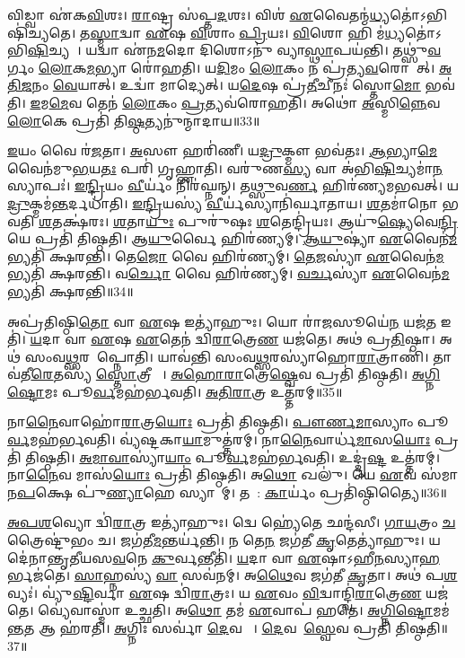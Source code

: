 𑌵𑌿𑌡𑍍𑌵𑌾 𑌏॑𑌕\ul{𑌵𑌿}\ul{}𑌶𑌃।
\ul{𑌰𑌾}𑌷𑍍𑌟𑍍𑌰 𑌸॑𑌪𑍍𑌤\ul{𑌦}𑌶𑌃।
𑌵𑌿𑌶॑ \ul{𑌏}𑌵𑍈𑌤𑌨𑍍𑌮॑\ul{𑌧𑍍𑌯}𑌤𑍋॑\-𑌽𑌭𑌿𑌷𑌿॑𑌚𑍍𑌯𑌤𑍇।
𑌤\ul{𑌸𑍍𑌮𑌾}𑌦𑍍𑌵𑌾 \ul{𑌏}𑌷 \ul{𑌵𑌿}𑌶𑌾𑌂 \ul{𑌪𑍍𑌰𑌿}𑌯𑌃।
\ul{𑌵𑌿}𑌶𑍋 𑌹𑌿 𑌮॑\ul{𑌧𑍍𑌯}𑌤𑍋॑\-𑌽𑌭𑌿\ul{𑌷𑌿}𑌚𑍍𑌯𑌤𑍇᳚।
𑌯𑌦𑍍𑌵𑌾 𑌏॑𑌨\ul{𑌮}𑌦𑍋 𑌦𑌿𑌶𑍋𑌽𑌨𑍁॑ 𑌵𑍍𑌯𑌾\ul{𑌸𑍍𑌥𑌾}𑌪𑌯॑𑌨𑍍𑌤𑌿।
𑌤𑌥𑍍𑌸𑍁॑\ul{𑌵}𑌰𑍍𑌗𑌂 \ul{𑌲𑍋}𑌕\ul{𑌮}𑌭𑍍𑌯𑌾 𑌰𑍋॑𑌹𑌤𑌿।
𑌯\ul{𑌦𑌿}𑌮𑌂 \ul{𑌲𑍋}𑌕𑌂 𑌨 𑌪𑍍𑌰॑𑌤𑍍𑌯\ul{𑌵}𑌰𑍋𑌹𑍇᳚𑌤𑍍।
\ul{𑌅}\ul{𑌤𑌿}\ul{𑌜}𑌨𑌂 \ul{𑌵𑍇}𑌯𑌾𑌤𑍍।
𑌉𑌦𑍍𑌵𑌾॑ 𑌮𑌾𑌦𑍍𑌯𑍇𑌤𑍍।
𑌯\ul{𑌦𑍇}𑌷 𑌪𑍍𑌰॑\ul{𑌤𑍀}𑌚𑍀𑌨𑌃॑ 𑌸𑍍𑌤𑍋\ul{𑌮𑍋} 𑌭𑌵॑𑌤𑌿।
\ul{𑌇}𑌮\ul{𑌮𑍇}𑌵 𑌤𑍇𑌨॑ \ul{𑌲𑍋}𑌕𑌂 \ul{𑌪𑍍𑌰}𑌤𑍍𑌯𑌵॑𑌰𑍋𑌹𑌤𑌿।
𑌅𑌥𑍋॑ \ul{𑌅}𑌸𑍍𑌮𑌿\ul{𑌨𑍍𑌨𑍇}𑌵 \ul{𑌲𑍋}𑌕𑍇 𑌪𑍍𑌰𑌤𑌿॑ 𑌤𑌿\ul{𑌷𑍍𑌠}𑌤𑍍𑌯𑌨𑍁॑𑌨𑍍𑌮𑌾𑌦𑌾𑌯॥33॥\anuvakamend[𑌅𑌕𑍍𑌰॑𑌨𑍍𑌰𑌾\ul{𑌜}𑌨𑍍𑌯𑍋॑ 𑌭𑌵॑𑌨𑍍𑌤𑌿 𑌦\ul{𑌶}𑌪𑍇𑌯𑍋॑ 𑌮𑌾\ul{𑌦𑍍𑌯𑍇}𑌤𑍍𑌤𑍍𑌰𑍀𑌣𑌿॑ 𑌚]

\ul{𑌇}𑌯𑌂 𑌵𑍈 𑌰॑\ul{𑌜}𑌤𑌾।
\ul{𑌅}𑌸𑍗 𑌹𑌰𑌿॑𑌣𑍀।
𑌯\ul{𑌦𑍍𑌰𑍁}𑌕𑍍𑌮𑍗 𑌭𑌵॑𑌤𑌃।
\ul{𑌆}𑌭𑍍𑌯𑌾\ul{𑌮𑍇}𑌵𑍈𑌨॑𑌮𑍁\ul{𑌭}𑌯\ul{𑌤𑌃} 𑌪𑌰𑌿॑ 𑌗𑍃𑌹𑍍𑌣𑌾𑌤𑌿।
𑌵𑌰𑍁॑𑌣\ul{𑌸𑍍𑌯} 𑌵𑌾 𑌅॑𑌭𑌿\ul{𑌷𑌿}𑌚𑍍𑌯𑌮𑌾॑\ul{𑌨}𑌸𑍍𑌯𑌾𑌪𑌃॑।
\ul{𑌇}\ul{𑌨𑍍𑌦𑍍𑌰𑌿}𑌯𑌂 \ul{𑌵𑍀}𑌰𑍍𑌯𑌂॑ 𑌨𑌿𑌰॑𑌘𑍍𑌨𑌨𑍍।
𑌤\ul{𑌥𑍍𑌸𑍁}𑌵\ul{𑌰𑍍𑌣}\ul{} 𑌹𑌿𑌰॑𑌣𑍍𑌯𑌮𑌭𑌵𑌤𑍍।
𑌯\ul{𑌦𑍍𑌰𑍁}𑌕𑍍𑌮𑌮॑\ul{𑌨𑍍𑌤}𑌰𑍍𑌦𑌧𑌾॑𑌤𑌿।
\ul{𑌇}\ul{𑌨𑍍𑌦𑍍𑌰𑌿}𑌯𑌸𑍍𑌯॑ \ul{𑌵𑍀}𑌰𑍍𑌯॑𑌸𑍍𑌯𑌾\-𑌨𑌿॑𑌰𑍍𑌘𑌾𑌤𑌾𑌯।
\ul{𑌶}𑌤𑌮𑌾॑𑌨𑍋 𑌭𑌵𑌤𑌿 \ul{𑌶}𑌤𑌕𑍍𑌷॑𑌰𑌃।
\ul{𑌶}𑌤𑌾\ul{𑌯𑍁𑌃} 𑌪𑍁𑌰𑍁॑𑌷𑌃 \ul{𑌶}𑌤𑍇𑌨𑍍𑌦𑍍𑌰𑌿॑𑌯𑌃।
𑌆𑌯𑍁॑\ul{𑌷𑍍𑌯𑍇}𑌵𑍇\ul{𑌨𑍍𑌦𑍍𑌰𑌿}𑌯𑍇 𑌪𑍍𑌰𑌤𑌿॑ 𑌤𑌿𑌷𑍍𑌠𑌤𑌿।
𑌆\ul{𑌯𑍁}𑌰𑍍𑌵𑍈 𑌹𑌿𑌰॑𑌣𑍍𑌯𑌮𑍍।
\ul{𑌆}\ul{𑌯𑍁}𑌷𑍍𑌯𑌾॑ \ul{𑌏}𑌵𑍈𑌨॑\ul{𑌮}𑌭𑍍𑌯𑌤𑌿॑ 𑌕𑍍𑌷𑌰𑌨𑍍𑌤𑌿।
𑌤𑍇\ul{𑌜𑍋} 𑌵𑍈 𑌹𑌿𑌰॑𑌣𑍍𑌯𑌮𑍍।
\ul{𑌤𑍇}\ul{𑌜}𑌸𑍍𑌯𑌾॑ \ul{𑌏}𑌵𑍈𑌨॑\ul{𑌮}𑌭𑍍𑌯𑌤𑌿॑ 𑌕𑍍𑌷𑌰𑌨𑍍𑌤𑌿।
𑌵\ul{𑌰𑍍𑌚𑍋} 𑌵𑍈 𑌹𑌿𑌰॑𑌣𑍍𑌯𑌮𑍍।
\ul{𑌵}\ul{𑌰𑍍𑌚}𑌸𑍍𑌯𑌾॑ \ul{𑌏}𑌵𑍈𑌨॑\ul{𑌮}𑌭𑍍𑌯𑌤𑌿॑ 𑌕𑍍𑌷𑌰𑌨𑍍𑌤𑌿॥34॥\anuvakamend[\ul{𑌶}𑌤𑌕𑍍𑌷॑\ul{𑌰𑍋}\-𑌽𑌷𑍍𑌟𑍗 𑌚॑]

𑌅𑌪𑍍𑌰॑𑌤𑌿𑌷𑍍𑌠𑌿\ul{𑌤𑍋} 𑌵𑌾 \ul{𑌏}𑌷 𑌇𑌤𑍍𑌯𑌾॑𑌹𑍁𑌃।
𑌯𑍋 𑌰𑌾॑\ul{𑌜}𑌸𑍂𑌯𑍇॑\ul{𑌨} 𑌯𑌜॑\ul{𑌤} 𑌇𑌤𑌿॑।
\ul{𑌯}𑌦𑌾 𑌵𑌾 \ul{𑌏}𑌷 \ul{𑌏}𑌤𑍇𑌨॑ 𑌦𑍍𑌵𑌿\ul{𑌰𑌾}𑌤𑍍𑌰𑍇\ul{𑌣} 𑌯𑌜॑𑌤𑍇।
𑌅𑌥॑ 𑌪𑍍𑌰\ul{𑌤𑌿}𑌷𑍍𑌠𑌾।
𑌅𑌥॑ 𑌸𑌂𑌵\ul{𑌥𑍍𑌸}𑌰𑌮𑌾᳚𑌪𑍍𑌨𑍋𑌤𑌿।
𑌯𑌾𑌵॑𑌨𑍍𑌤𑌿 𑌸𑌂𑌵\ul{𑌥𑍍𑌸}𑌰𑌸𑍍𑌯𑌾॑𑌹𑍋\ul{𑌰𑌾}𑌤𑍍𑌰𑌾𑌣𑌿॑।
𑌤𑌾𑌵॑𑌤𑍀\ul{𑌰𑍇}𑌤𑌸𑍍𑌯॑ \ul{𑌸𑍍𑌤𑍋}𑌤𑍍𑌰𑍀𑌯𑌾𑌃᳚।
\ul{𑌅}\ul{𑌹𑍋}\ul{𑌰𑌾}𑌤𑍍𑌰𑍇\ul{𑌷𑍍𑌵𑍇}𑌵 𑌪𑍍𑌰𑌤𑌿॑ 𑌤𑌿𑌷𑍍𑌠𑌤𑌿।
\ul{𑌅}\ul{𑌗𑍍𑌨𑌿}\ul{𑌷𑍍𑌟𑍋}𑌮𑌃 𑌪𑍂\ul{𑌰𑍍𑌵}𑌮𑌹॑𑌰𑍍𑌭𑌵𑌤𑌿।
\ul{𑌅}\ul{𑌤𑌿}\ul{𑌰𑌾}𑌤𑍍𑌰 𑌉𑌤𑍍𑌤॑𑌰𑌮𑍍॥35॥

𑌨𑌾\ul{𑌨𑍈}𑌵𑌾𑌹𑍋॑\ul{𑌰𑌾}𑌤𑍍𑌰\ul{𑌯𑍋𑌃} 𑌪𑍍𑌰𑌤𑌿॑ 𑌤𑌿𑌷𑍍𑌠𑌤𑌿।
\ul{𑌪𑍗}\ul{𑌰𑍍𑌣}\ul{𑌮𑌾}𑌸𑍍𑌯𑌾𑌂 𑌪𑍂\ul{𑌰𑍍𑌵}𑌮𑌹॑𑌰𑍍𑌭𑌵𑌤𑌿।
𑌵𑍍𑌯॑𑌷𑍍𑌟𑌕𑌾\ul{𑌯𑌾}𑌮𑍁𑌤𑍍𑌤॑𑌰𑌮𑍍।
𑌨𑌾\ul{𑌨𑍈}𑌵𑌾𑌰𑍍𑌧॑\ul{𑌮𑌾}𑌸\ul{𑌯𑍋𑌃} 𑌪𑍍𑌰𑌤𑌿॑ 𑌤𑌿𑌷𑍍𑌠𑌤𑌿।
\ul{𑌅}\ul{𑌮𑌾}\ul{𑌵𑌾}𑌸𑍍𑌯𑌾॑\ul{𑌯𑌾𑌂} 𑌪𑍂\ul{𑌰𑍍𑌵}𑌮𑌹॑𑌰𑍍𑌭𑌵𑌤𑌿।
𑌉𑌦𑍍𑌦𑍃॑\ul{𑌷𑍍𑌟} 𑌉𑌤𑍍𑌤॑𑌰𑌮𑍍।
𑌨𑌾\ul{𑌨𑍈}𑌵 𑌮𑌾𑌸॑\ul{𑌯𑍋𑌃} 𑌪𑍍𑌰𑌤𑌿॑ 𑌤𑌿𑌷𑍍𑌠𑌤𑌿।
𑌅\ul{𑌥𑍋} 𑌖𑌲𑍁॑।
𑌯𑍇 \ul{𑌏}𑌵 𑌸॑𑌮𑌾𑌨\ul{𑌪}𑌕𑍍𑌷𑍇 𑌪𑍁॑\ul{𑌣𑍍𑌯𑌾}𑌹𑍇 𑌸𑍍𑌯𑌾𑌤𑌾᳚𑌮𑍍।
𑌤𑌯𑍋᳚: \ul{𑌕𑌾}𑌰𑍍𑌯𑌂॑ 𑌪𑍍𑌰𑌤𑌿॑\-𑌷𑍍𑌠𑌿𑌤𑍍𑌯𑍈॥36॥

\ul{𑌅}\ul{𑌪}\ul{𑌶}𑌵𑍍𑌯𑍋 𑌦𑍍𑌵𑌿॑\ul{𑌰𑌾}𑌤𑍍𑌰 𑌇𑌤𑍍𑌯𑌾॑𑌹𑍁𑌃।
𑌦𑍍𑌵𑍇 𑌹𑍍𑌯𑍇॑𑌤𑍇 𑌛𑌨𑍍𑌦॑𑌸𑍀।
\ul{𑌗𑌾}\ul{𑌯}𑌤𑍍𑌰𑌂 \ul{𑌚} 𑌤𑍍𑌰𑍈𑌷𑍍𑌟𑍁॑𑌭𑌂 𑌚।
𑌜𑌗॑𑌤𑍀\ul{𑌮}𑌨𑍍𑌤𑌰𑍍𑌯॑𑌨𑍍𑌤𑌿।
𑌨 𑌤𑍇\ul{𑌨} 𑌜𑌗॑𑌤𑍀 \ul{𑌕𑍃}𑌤𑍇𑌤𑍍𑌯𑌾॑𑌹𑍁𑌃।
𑌯𑌦𑍇॑𑌨𑌾𑌨𑍍𑌤𑍃𑌤𑍀𑌯𑌸\ul{𑌵}𑌨𑍇 \ul{𑌕𑍁}𑌰𑍍𑌵𑌨𑍍𑌤𑍀𑌤𑌿॑।
\ul{𑌯}𑌦𑌾 𑌵𑌾 \ul{𑌏}𑌷𑌾\-𑌽𑌹𑍀\ul{𑌨}𑌸𑍍𑌯𑌾\ul{𑌹}𑌰𑍍𑌭𑌜॑𑌤𑍇।
\ul{𑌸𑌾}𑌹𑍍𑌨𑌸𑍍𑌯॑ \ul{𑌵𑌾} 𑌸𑌵॑𑌨𑌮𑍍।
𑌅\ul{𑌥𑍈}𑌵 𑌜𑌗॑𑌤𑍀 \ul{𑌕𑍃}𑌤𑌾।
𑌅𑌥॑ 𑌪\ul{𑌶}𑌵𑍍𑌯𑌃॑।
𑌵𑍍𑌯𑍁॑\ul{𑌷𑍍𑌟𑌿}𑌰𑍍𑌵𑌾 \ul{𑌏}𑌷 𑌦𑍍𑌵𑌿॑\ul{𑌰𑌾}𑌤𑍍𑌰𑌃।
𑌯 \ul{𑌏}𑌵𑌂 \ul{𑌵𑌿}𑌦𑍍𑌵𑌾𑌨𑍍𑌦𑍍𑌵𑌿॑\ul{𑌰𑌾}𑌤𑍍𑌰𑍇\ul{𑌣} 𑌯𑌜॑𑌤𑍇।
𑌵𑍍𑌯𑍇॑𑌵𑌾𑌸𑍍𑌮𑌾॑ 𑌉𑌚𑍍𑌛𑌤𑌿।
𑌅\ul{𑌥𑍋} 𑌤𑌮॑ \ul{𑌏}𑌵𑌾𑌪॑ 𑌹𑌤𑍇।
\ul{𑌅}\ul{𑌗𑍍𑌨𑌿}\ul{𑌷𑍍𑌟𑍋}𑌮𑌮॑\ul{𑌨𑍍𑌤}𑌤 𑌆 𑌹॑𑌰𑌤𑌿।
\ul{𑌅}𑌗𑍍𑌨𑌿𑌃 𑌸𑌰𑍍𑌵𑌾॑ \ul{𑌦𑍇}𑌵𑌤𑌾𑌃᳚।
\ul{𑌦𑍇}𑌵𑌤𑌾᳚\ul{𑌸𑍍𑌵𑍇}𑌵 𑌪𑍍𑌰𑌤𑌿॑ 𑌤𑌿𑌷𑍍𑌠𑌤𑌿॥37॥\anuvakamend[𑌉𑌤𑍍𑌤॑\ul{𑌰𑌂} 𑌪𑍍𑌰𑌤𑌿॑\-𑌷𑍍𑌠𑌿𑌤𑍍𑌯𑍈 𑌪\ul{𑌶}𑌵𑍍𑌯𑌃॑ \ul{𑌸}𑌪𑍍𑌤 𑌚॑]

